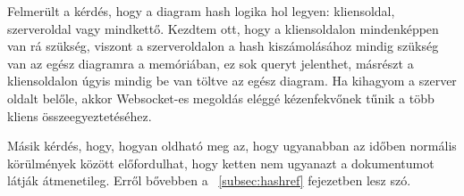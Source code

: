 Felmerült a kérdés, hogy a diagram hash logika hol legyen: kliensoldal, szerveroldal vagy mindkettő. Kezdtem ott, hogy a kliensoldalon mindenképpen van rá szükség, viszont a szerveroldalon a hash kiszámolásához mindig szükség van az egész diagramra a memóriában, ez sok queryt jelenthet, másrészt a kliensoldalon úgyis mindig be van töltve az egész diagram. Ha kihagyom a szerver oldalt belőle, akkor Websocket-es megoldás eléggé kézenfekvőnek tűnik a több kliens összeegyeztetéséhez.

Másik kérdés, hogy, hogyan oldható meg az, hogy ugyanabban az időben normális körülmények között előfordulhat, hogy ketten nem ugyanazt a dokumentumot látják átmenetileg. Erről bővebben a ~\ref{subsec:hashref} fejezetben lesz szó.

